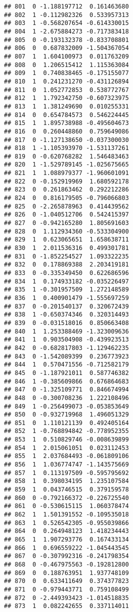\documentclass[
]{article}
\begin{document}
\begin{verbatim}
## 801  0 -1.188197712  0.161463680
## 802  1 -0.112982326  0.533957313
## 803  1 -0.568207654 -0.614330015
## 804  1 -2.675884273 -0.717383418
## 805  0 -0.193132378 -0.833708801
## 806  0  0.687832009 -1.504367054
## 807  1  1.604100973  0.011763209
## 808  0  1.206515412  1.115363084
## 809  1  0.740838465 -0.175155077
## 810  1  0.241231270 -0.431126894
## 811  0  1.052772853  0.538772767
## 812  1  1.792342750 -0.607323975
## 813  1  1.381249690  0.010255331
## 814  0  0.654784573  0.546224445
## 815  1  1.895738988 -0.495604673
## 816  0  0.260448860  0.759649086
## 817  0 -1.127138650 -0.037300030
## 818  1 -1.105393970 -1.531137261
## 819  0 -0.620768282  1.546483463
## 820  1 -1.529789145 -1.025675665
## 821  1  1.088979377 -1.960601091
## 822  0 -0.152919969  1.680592178
## 823  0  0.261863462  0.292212286
## 824  0  0.816179505 -0.796066803
## 825  0 -2.265878963  0.414439562
## 826  0 -1.040512706  0.542415397
## 827  0 -0.942165280  1.805691603
## 828  0  1.112934360 -0.533304900
## 829  1  0.623065651  1.658638711
## 830  1  2.011536316  0.499301781
## 831  0 -1.852254527  1.093322235
## 832  0  0.178869388  2.203419181
## 833  0 -0.335349450  0.622686596
## 834  1  0.174933182 -0.035226497
## 835  1 -0.301957509  1.272148589
## 836  1  0.400901479 -1.555697259
## 837  0 -0.201540137  0.320672439
## 838  1 -0.650374346  0.320314493
## 839  0 -0.031518016  0.850663408
## 840  1  1.253388469 -1.323009636
## 841  1  0.903504908 -0.439923513
## 842  0 -0.682817803 -1.129462235
## 843  0 -1.542089399  0.236773923
## 844  1  0.570471556 -0.712582179
## 845  0 -1.187921011  0.587746382
## 846  1 -0.385609866  0.676864683
## 847  0 -1.325109771  0.846674994
## 848  0 -0.300708236  1.222108496
## 849  1 -0.256499073 -0.053853649
## 850  0 -0.932719968  1.496051329
## 851  0  1.110121139  0.492405164
## 852  1 -0.768894842 -0.778952355
## 853  1  0.510829746 -0.008639899
## 854  1  2.015061051  0.023112453
## 855  1  2.037684493 -0.061809106
## 856  1  1.036774747 -1.143575669
## 857  1  0.113197509 -0.595795692
## 858  1  0.398034195  1.235107584
## 859  1  0.043746515  0.379159578
## 860  0 -0.792166372 -0.226725540
## 861  0 -0.530615115  1.060378474
## 862  1  1.501391552 -0.109535018
## 863  1  0.526542305 -0.955039866
## 864  0  0.264948123  1.418234443
## 865  1  1.907293776  0.167433134
## 866  1  0.696559222 -1.045443545
## 867  0 -0.307992316 -0.241798354
## 868  0 -0.467975563 -0.192812800
## 869  0  0.188763951  1.937748109
## 870  0  0.633411649  0.374377823
## 871  0 -0.979443771  0.759108499
## 872  0 -2.449393423 -1.014518835
## 873  1  0.082242655  0.337114011

\end{verbatim}
\end{document}
